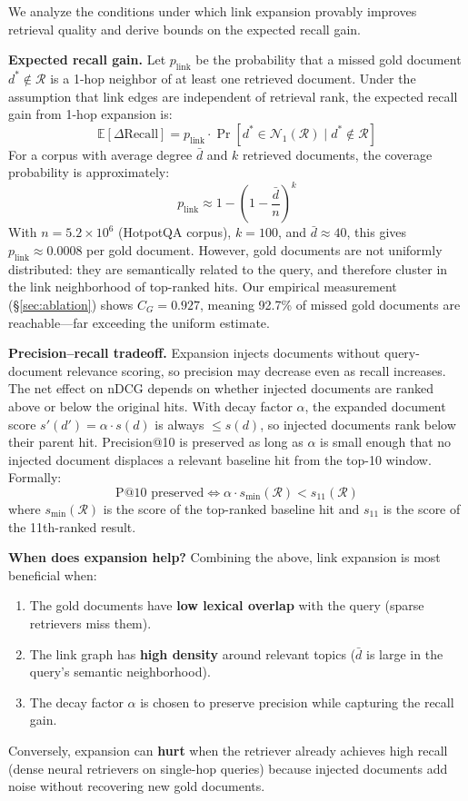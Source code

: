 \documentclass[sigconf,review]{acmart}
\begin{document}
We analyze the conditions under which link expansion provably improves
retrieval quality and derive bounds on the expected recall gain.

\textbf{Expected recall gain.}
Let $p_{\text{link}}$ be the probability that a missed gold document $d^* \notin
\mathcal{R}$ is a 1-hop neighbor of at least one retrieved document.
Under the assumption that link edges are independent of retrieval rank,
the expected recall gain from 1-hop expansion is:
\[
  \mathbb{E}[\Delta\text{Recall}] = p_{\text{link}} \cdot \Pr[d^* \in \mathcal{N}_1(\mathcal{R}) \mid d^* \notin \mathcal{R}]
\]
For a corpus with average degree $\bar{d}$ and $k$ retrieved documents,
the coverage probability is approximately:
\[
  p_{\text{link}} \approx 1 - \left(1 - \frac{\bar{d}}{n}\right)^{k}
\]
With $n = 5.2 \times 10^6$ (HotpotQA corpus), $k = 100$, and
$\bar{d} \approx 40$, this gives $p_{\text{link}} \approx 0.0008$ per
gold document. However, gold documents are not uniformly distributed:
they are semantically related to the query, and therefore cluster in
the link neighborhood of top-ranked hits.  Our empirical measurement
(\S\ref{sec:ablation}) shows $C_G = 0.927$, meaning 92.7\% of missed
gold documents are reachable---far exceeding the uniform estimate.

\textbf{Precision--recall tradeoff.}
Expansion injects documents without query-document relevance scoring,
so precision may decrease even as recall increases.  The net effect on
nDCG depends on whether injected documents are ranked above or below the
original hits.  With decay factor $\alpha$, the expanded document score
$s'(d') = \alpha \cdot s(d)$ is always $\leq s(d)$, so injected documents
rank below their parent hit.  Precision@10 is preserved as long as
$\alpha$ is small enough that no injected document displaces a relevant
baseline hit from the top-10 window.  Formally:
\[
  \text{P@10 preserved} \iff \alpha \cdot s_{\min}(\mathcal{R}) < s_{11}(\mathcal{R})
\]
where $s_{\min}(\mathcal{R})$ is the score of the top-ranked baseline hit
and $s_{11}$ is the score of the 11th-ranked result.

\textbf{When does expansion help?}
Combining the above, link expansion is most beneficial when:
\begin{enumerate}[leftmargin=*,nosep]
\item The gold documents have \textbf{low lexical overlap} with the query
      (sparse retrievers miss them).
\item The link graph has \textbf{high density} around relevant topics
      ($\bar{d}$ is large in the query's semantic neighborhood).
\item The decay factor $\alpha$ is chosen to preserve precision while
      capturing the recall gain.
\end{enumerate}
Conversely, expansion can \textbf{hurt} when the retriever already
achieves high recall (dense neural retrievers on single-hop queries)
because injected documents add noise without recovering new gold documents.
\end{document}
